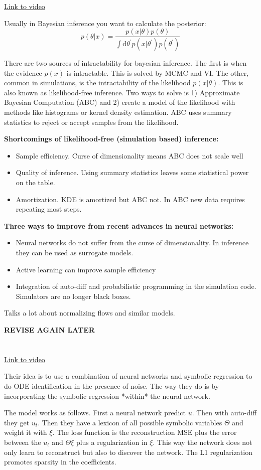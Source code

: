 \documentclass{article}
\newcommand{\citeall}[1]{\citeauthor{#1}}
\newcommand{\uls}{\begin{itemize}}
\newcommand{\ule}{\end{itemize}}
\newcommand{\li}{\item}
\begin{document}
\href{https://www.youtube.com/watch?v=odAQlcf5Urc}{Link to video}

Usually in Bayesian inference you want to calculate the posterior:
$$
p(\theta | x)=\frac{p(x | \theta) p(\theta)}{\int \mathrm{d} \theta^{\prime} p\left(x | \theta^{\prime}\right) p\left(\theta^{\prime}\right)}
$$

There are two sources of intractability for bayesian inference. The first is when the evidence $p(x)$ is intractable. This is solved by MCMC and VI. The other, common in simulations, is the intractability of the likelihood $p(x|\theta)$. This is also known as likelihood-free inference. Two ways to solve is 1) Approximate Bayesian Computation (ABC) and 2) create a model of the likelihood with methods like histograms or kernel density estimation. ABC uses summary statistics to reject or accept samples from the likelihood.

\textbf{Shortcomings of likelihood-free (simulation based) inference:
}\uls
\li Sample efficiency. Curse of dimensionality means ABC does not scale well
\li Quality of inference. Using summary statistics leaves some statistical power on the table.
\li Amortization. KDE is amortized but ABC not. In ABC new data requires repeating most steps. 
\ule

\textbf{Three ways to improve from recent advances in neural networks:
}
\uls
\li Neural networks do not suffer from the curse of dimensionality. In inference they can be used as surrogate models.
\li Active learning can improve sample efficiency
\li Integration of auto-diff and probabilistic programming in the simulation code. Simulators are no longer black boxes.
\ule

Talks a lot about normalizing flows and similar models.

\textbf{REVISE AGAIN LATER}

\section{\citeall{Both2019DeepMoD:Data}}

\href{https://www.youtube.com/watch?v=Ml4EXS_MUBc}{Link to video}

Their idea is to use a combination of neural networks and symbolic regression to do ODE identification in the presence of noise. The way they do is by incorporating the symbolic regression *within* the neural network. 

The model works as follows. First a neural network predict $u$. Then with auto-diff they get $u_t$. Then they have a lexicon of all possible symbolic variables $\Theta$ and weight it with $\xi$. The loss function is the reconstruction MSE plus the error between the $u_t$ and $\Theta \dot \xi$ plus a regularization in $\xi$. This way the network does not only learn to reconstruct but also to discover the network. The L1 regularization promotes sparsity in the coefficients. 
\end{document}

